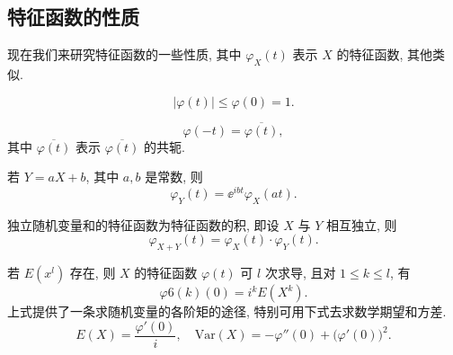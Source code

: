 \subsection{特征函数的性质}

现在我们来研究特征函数的一些性质,
其中 $ \varphi_X (t) $ 表示 $ X $ 的特征函数,
其他类似.

\begin{property}\label{prop:4.1.1}
    \begin{equation}\label{eq:4.1.4}
        \lvert \varphi (t) \rvert \leq \varphi (0) = 1.
    \end{equation}
\end{property}

\begin{property}\label{prop:4.1.2}
    \begin{equation}\label{eq:4.1.5}
        \varphi (-t) = \overline{\varphi (t)},
    \end{equation}
    其中 $ \overline{\varphi (t)} $ 表示 $ \overline{\varphi (t)} $ 的共轭.
\end{property}

\begin{property}\label{prop:4.1.3}
    若 $ Y = aX + b $, 其中 $ a,b $ 是常数, 则
    \begin{equation}\label{eq:4.1.6}
        \varphi_Y (t) = \ee^{ibt} \varphi_X (at).
    \end{equation}
\end{property}

\begin{property}\label{prop:4.1.4}
    独立随机变量和的特征函数为特征函数的积,
    即设 $ X $ 与 $ Y $ 相互独立, 则
    \begin{equation}\label{eq:4.1.7}
        \varphi_{X+Y} (t) = \varphi_X (t) \cdot \varphi_Y (t).
    \end{equation}
\end{property}

\begin{property}\label{prop:4.1.5}
    若 $ E (x^l) $ 存在,
    则 $ X $ 的特征函数 $ \varphi(t) $ 可 $ l $ 次求导,
    且对 $ 1 \leq k \leq l $, 有
    \begin{equation}\label{eq:4.1.8}
        \varphi6{(k)} (0) = i^k E ( X^k ).
    \end{equation}
    上式提供了一条求随机变量的各阶矩的途径,
    特别可用下式去求数学期望和方差.
    \begin{equation}\label{eq:4.1.9}
        E (X) = \frac{\varphi' (0)}{i}, \quad \mathrm{Var} (X) = - \varphi'' (0) + \bigl( \varphi' (0) \bigr)^2.
    \end{equation}
\end{property}

